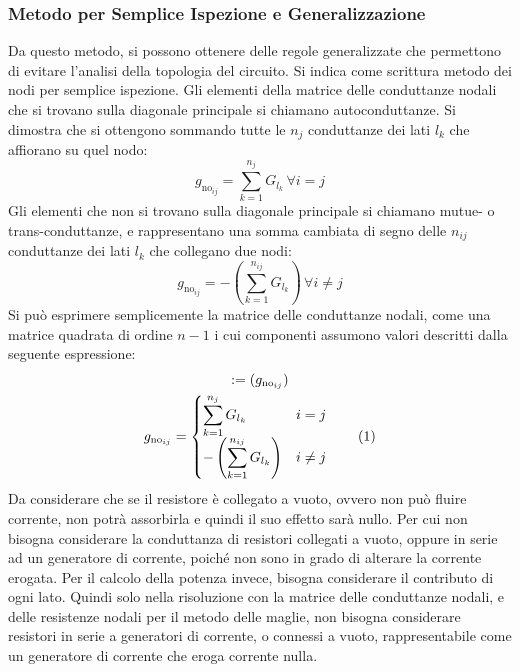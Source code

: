 \documentclass{article}
\newcommand{\tageq}{\tag{\stepcounter{equation}\theequation}}
\numberwithin{equation}{subsection}
\begin{document}
\subsubsection{Metodo per Semplice Ispezione e Generalizzazione}

Da questo metodo, si possono ottenere delle regole generalizzate che permettono di evitare l'analisi della topologia del circuito. Si indica come scrittura metodo dei nodi 
per semplice ispezione. Gli elementi della matrice delle conduttanze nodali che si trovano sulla diagonale principale si chiamano autoconduttanze. Si dimostra che si ottengono 
sommando tutte le $n_{j}$ conduttanze dei lati $l_k$ che affiorano su quel nodo:
\begin{equation*}
    g_{\mathrm{no}_{ij}}=\displaystyle\sum_{k=1}^{n_j}G_{l_k}\,\forall i= j
\end{equation*}
Gli elementi che non si trovano sulla diagonale principale si chiamano mutue- o trans-conduttanze, e rappresentano una somma cambiata di segno delle $n_{ij}$ conduttanze dei lati 
$l_k$ che collegano due nodi:
\begin{equation*}
    g_{\mathrm{no}_{ij}}=-\displaystyle\left(\sum_{k=1}^{n_{ij}}G_{l_k}\right)\,\forall i\neq j
\end{equation*}
Si può esprimere semplicemente la matrice delle conduttanze nodali, come una matrice quadrata di ordine $n-1$ i cui componenti assumono valori descritti dalla seguente 
espressione: 
\begin{gather*}
    [G_\mathrm{no}]:=(g_{\mathrm{no}_{ij}})\\
    g_{\mathrm{no}_{ij}}=\begin{cases}
        \displaystyle\sum_{k=1}^{n_j}G_{l_k} &i=j\\
        -\displaystyle\left(\sum_{k=1}^{n_{ij}}G_{l_k}\right)&i\neq j
    \end{cases}\tageq
\end{gather*}
Da considerare che se il resistore è collegato a vuoto, ovvero non può fluire corrente, non potrà assorbirla e quindi il suo effetto sarà nullo. Per cui non bisogna considerare 
la conduttanza di resistori collegati a vuoto, oppure in serie ad un generatore di corrente, poiché non sono in grado di alterare la corrente erogata. Per il calcolo della potenza 
invece, bisogna considerare il contributo di ogni lato. Quindi solo nella risoluzione con la matrice delle conduttanze nodali, e delle resistenze nodali per il metodo 
delle maglie, non bisogna considerare resistori in serie a generatori di corrente, o connessi a vuoto, rappresentabile come un generatore di corrente che eroga corrente nulla. 
\end{document}
